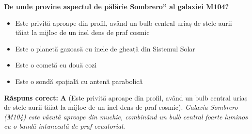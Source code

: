 \vspace{6pt}
\begin{tcolorbox}[orbitarquiz, title={\textbf{Întrebare de verificare \#74: Galaxia Sombrero (M104)}}]
\textbf{De unde provine aspectul de \quotedblbase{}pălărie Sombrero\textquotedblright{} al galaxiei M104?}
\begin{itemize}[leftmargin=2.2em, itemsep=2pt, topsep=4pt]
  \item[$\square$ \textbf{A.}] Este privită aproape din profil, având un bulb central uriaș de stele aurii tăiat la mijloc de un inel dens de praf cosmic
  \item[$\square$ \textbf{B.}] Este o planetă gazoasă cu inele de gheață din Sistemul Solar
  \item[$\square$ \textbf{C.}] Este o cometă cu două cozi
  \item[$\square$ \textbf{D.}] Este o sondă spațială cu antenă parabolică
\end{itemize}
\vspace{2pt}
{\footnotesize\color{orbitarMuted}\textbf{Răspuns corect:} \textbf{A} (Este privită aproape din profil, având un bulb central uriaș de stele aurii tăiat la mijloc de un inel dens de praf cosmic). \emph{Galaxia Sombrero (M104) este văzută aproape din muchie, combinând un bulb central foarte luminos cu o bandă întunecată de praf ecuatorial.}}
\end{tcolorbox}
\clearpage

